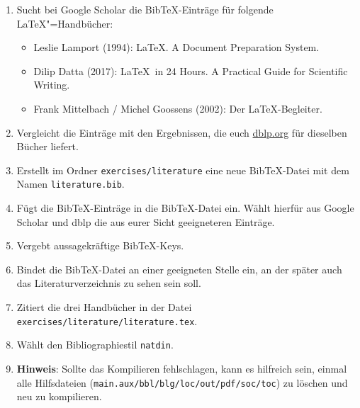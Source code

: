 \begin{enumerate}
  \item Sucht bei Google Scholar die Bib\TeX-Einträge für folgende \LaTeX"=Handbücher:
  \begin{itemize}
    \item Leslie Lamport (1994): \LaTeX. A Document Preparation System.
    \item Dilip Datta (2017): \LaTeX\ in 24 Hours. A Practical Guide for Scientific Writing.
    \item Frank Mittelbach / Michel Goossens (2002): Der \LaTeX-Begleiter.
  \end{itemize}
  \item Vergleicht die Einträge mit den Ergebnissen, die euch \url{dblp.org} für dieselben Bücher liefert.
  \item Erstellt im Ordner \texttt{exercises/literature} eine neue Bib\TeX-Datei mit dem Namen \texttt{literature.bib}.
  \item Fügt die Bib\TeX-Einträge in die Bib\TeX-Datei ein. Wählt hierfür aus Google Scholar und dblp die aus eurer Sicht geeigneteren Einträge.
  \item Vergebt aussagekräftige Bib\TeX-Keys.
  \item Bindet die Bib\TeX-Datei an einer geeigneten Stelle ein, an der später auch das Literaturverzeichnis zu sehen sein soll.
  \item Zitiert die drei Handbücher in der Datei\\\texttt{exercises/literature/literature.tex}.
  \item Wählt den Bibliographiestil \texttt{natdin}.
  \item \textbf{Hinweis}: Sollte das Kompilieren fehlschlagen, kann es hilfreich sein, einmal alle Hilfsdateien (\texttt{main.aux/bbl/blg/loc/out/pdf/soc/toc}) zu löschen und neu zu kompilieren.
\end{enumerate}

